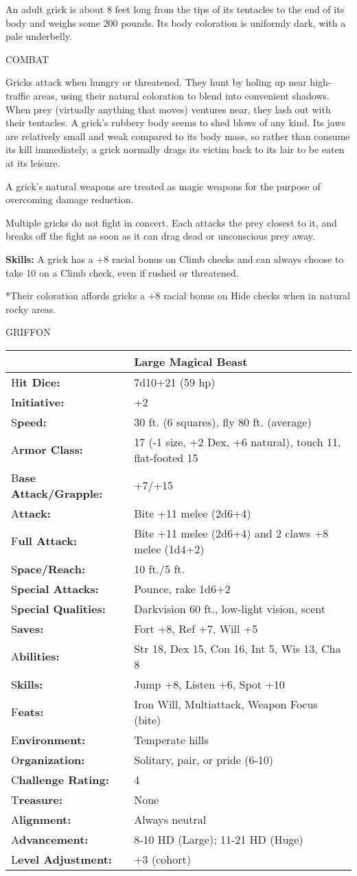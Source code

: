 \documentclass{article}
\begin{document}
An adult grick is about 8 feet long from the tips of its tentacles to the end of 
its body and weighs some 200 pounds. Its body coloration is uniformly dark, with 
a pale underbelly.

COMBAT

Gricks attack when hungry or threatened. They hunt by holing up near high-traffic 
areas, using their natural coloration to blend into convenient shadows. When prey 
(virtually anything that moves) ventures near, they lash out with their tentacles. 
A grick's rubbery body seems to shed blows of any kind. Its jaws are relatively 
small and weak compared to its body mass, so rather than consume its kill immediately, 
a grick normally drags its victim back to its lair to be eaten at its leisure.

A grick's natural weapons are treated as magic weapons for the purpose of overcoming 
damage reduction.

Multiple gricks do not fight in concert. Each attacks the prey closest to it, and 
breaks off the fight as soon as it can drag dead or unconscious prey away.

\textbf{Skills:} A grick has a +8 racial bonus on Climb checks and can always choose 
to take 10 on a Climb check, even if rushed or threatened.

*Their coloration affords gricks a +8 racial bonus on Hide checks when in natural 
rocky areas.

\vspace{12pt}
{\LARGE{}GRIFFON}

\begin{tabular}{|>{\raggedright}p{91pt}|>{\raggedright}p{226pt}|}
\hline
  & Large Magical Beast\tabularnewline
\hline
H\textbf{it Dice:} & 7d10+21 (59 hp)\tabularnewline
\hline
I\textbf{nitiative:} & +2\tabularnewline
\hline
S\textbf{peed:} & 30 ft. (6 squares), fly 80 ft. (average)\tabularnewline
\hline
A\textbf{rmor Class:} & 17 (-1 size, +2 Dex, +6 natural), touch 11, flat-footed 
15\tabularnewline
\hline
B\textbf{ase Attack/Grapple:} & +7/+15\tabularnewline
\hline
A\textbf{ttack:} & Bite +11 melee (2d6+4)\tabularnewline
\hline
F\textbf{ull Attack:} & Bite +11 melee (2d6+4) and 2 claws +8 melee (1d4+2)\tabularnewline
\hline
S\textbf{pace/Reach:} & 10 ft./5 ft.\tabularnewline
\hline
S\textbf{pecial Attacks:} & Pounce, rake 1d6+2\tabularnewline
\hline
S\textbf{pecial Qualities:} & Darkvision 60 ft., low-light vision, scent\tabularnewline
\hline
S\textbf{aves:} & Fort +8, Ref +7, Will +5\tabularnewline
\hline
A\textbf{bilities:} & Str 18, Dex 15, Con 16, Int 5, Wis 13, Cha 8\tabularnewline
\hline
S\textbf{kills:} & Jump +8, Listen +6, Spot +10\tabularnewline
\hline
F\textbf{eats:} & Iron Will, Multiattack, Weapon Focus (bite)\tabularnewline
\hline
E\textbf{nvironment:} & Temperate hills\tabularnewline
\hline
O\textbf{rganization:} & Solitary, pair, or pride (6-10)\tabularnewline
\hline
C\textbf{hallenge Rating:} & 4\tabularnewline
\hline
T\textbf{reasure:} & None\tabularnewline
\hline
A\textbf{lignment:} & Always neutral\tabularnewline
\hline
A\textbf{dvancement:} & 8-10 HD (Large); 11-21 HD (Huge)\tabularnewline
\hline
L\textbf{evel Adjustment:} & +3 (cohort)\tabularnewline
\hline
\end{tabular}
\end{document}
